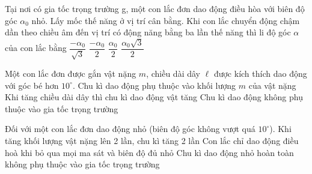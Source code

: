 \begin{ex} %

Tại nơi có gia tốc trọng trường g, một con lắc đơn dao động điều hòa với biên độ góc $\alpha_0$ nhỏ. Lấy mốc thế năng ở vị trí cân bằng. Khi con lắc chuyển động chậm dần theo chiều âm đến vị trí có động năng bằng ba lần thế năng thì li độ góc $\alpha$ của con lắc bằng
\choice
{$\dfrac{-\alpha_0}{\sqrt{3}}$}
{\True $\dfrac{-\alpha_0}{2}$}
{$\dfrac{\alpha_0}{2}$}
{$\dfrac{\alpha_0\sqrt{3}}{2}$}
\end{ex} 
\setcounter{ex}{0}
\PhanII
\begin{ex}
Một con lắc đơn được gắn vật nặng $m$, chiều dài dây $\ell$ được kích thích dao động với góc bé hơn $10^\circ$.
{Chu kì dao động phụ thuộc vào khối lượng $m$ của vật nặng}
{\True Khi tăng chiều dài dây thì chu kì dao động vật tăng}
{Chu kì dao động không phụ thuộc vào gia tốc trọng trường}
\loigiai{
\begin{itemchoice}
\itemch
\itemch
\itemch
\itemch
\end{itemchoice}
}
\end{ex} 
\begin{ex}
Đối với một con lắc đơn dao động nhỏ (biên độ góc không vượt quá $10^\circ$).
{Khi tăng khối lượng vật nặng lên 2 lần, chu kì tăng 2 lần}
{\True Con lắc chỉ dao động điều hoà khi bỏ qua mọi ma sát và biên độ đủ nhỏ}
{Chu kì dao động nhỏ hoàn toàn không phụ thuộc vào gia tốc trọng trường}
\end{ex}
